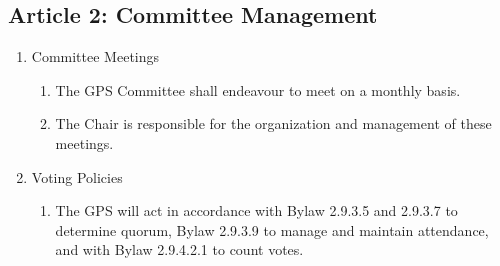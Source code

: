 \subsection{Article 2: Committee Management}
\begin{enumerate}[label*=\arabic*., align=left]	
\item Committee Meetings
\begin{enumerate}[label*=\arabic*., align=left]	
\item The GPS Committee shall endeavour to meet on a monthly basis.
\item The Chair is responsible for the organization and management of these
meetings.
\end{enumerate}

\item Voting Policies
\begin{enumerate}[label*=\arabic*., align=left]	
\item The GPS will act in accordance with Bylaw 2.9.3.5 and 2.9.3.7 to determine quorum, Bylaw 2.9.3.9 to manage and maintain attendance, and with Bylaw 2.9.4.2.1 to count votes.
\end{enumerate}
\end{enumerate}

